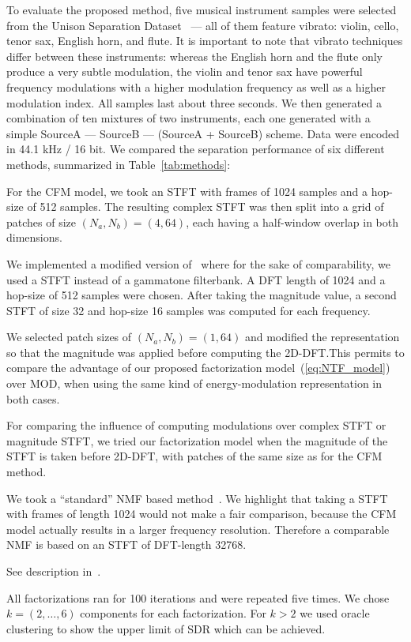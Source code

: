To evaluate the proposed method, five musical instrument samples were selected from the Unison Separation Dataset~\cite{oss_unison} --- all of them feature vibrato: 
violin, cello, tenor sax, English horn, and flute. 
It is important to note that vibrato techniques differ between these instruments: 
whereas the English horn and the flute only produce a very subtle modulation, the violin and tenor sax have powerful frequency modulations with a higher modulation frequency as well as a higher modulation index. 
All samples last about three seconds. 
We then generated a combination of ten mixtures of two instruments, each one generated with a simple SourceA --- SourceB --- (SourceA + SourceB) scheme. Data were encoded in 44.1 kHz / 16 bit.
We compared the separation performance of six different methods, summarized in Table~\ref{tab:methods}:
\begin{description}[style=unboxed,leftmargin=0cm]
\item[CFM] For the CFM model, we took an \acs{STFT} with frames of 1024 samples and a hop-size of 512 samples. The resulting complex \acs{STFT} was then split into a grid of patches of size $(N_a, N_b) = (4, 64)$, each having a half-window overlap in both dimensions.
\item[MOD] We implemented a modified version of~\cite{barker13} where for the sake of comparability, we used a \acs{STFT} instead of a gammatone filterbank. A DFT length of 1024 and a hop-size of 512 samples were chosen. After taking the magnitude value, a second \acs{STFT} of size 32 and hop-size 16 samples was computed for each frequency.
\item[CFMMOD] We selected patch sizes of $(N_a, N_b) = (1, 64)$ and modified the representation so that the magnitude was applied before computing the 2D-DFT.\@ This permits to compare the advantage of our proposed factorization model~(\ref{eq:NTF_model}) over MOD, when using the same kind of energy-modulation representation in both cases.
\item[CFMM] For comparing the influence of computing modulations over complex \acs{STFT} or magnitude \acs{STFT}, we tried our factorization model when the magnitude of the \acs{STFT} is taken before 2D-DFT, with patches of the same size as for the CFM method.
\item[NMF] We took a ``standard'' \acs{NMF} based method~\cite{virtanen07}. We highlight that taking a \acs{STFT} with frames of length 1024 would not make a fair comparison, because the CFM model actually results in a larger frequency resolution. Therefore a comparable \acs{NMF} is based on an \acs{STFT} of DFT-length 32768.
\item[HR-NMF] See description in~\cite{magron15a}.
\end{description}
All factorizations ran for 100 iterations and were repeated five times. We chose $k=(2,\ldots,6)$ components for each factorization. For $k > 2$ we used oracle clustering to show the upper limit of \ac{SDR} which can be achieved.

